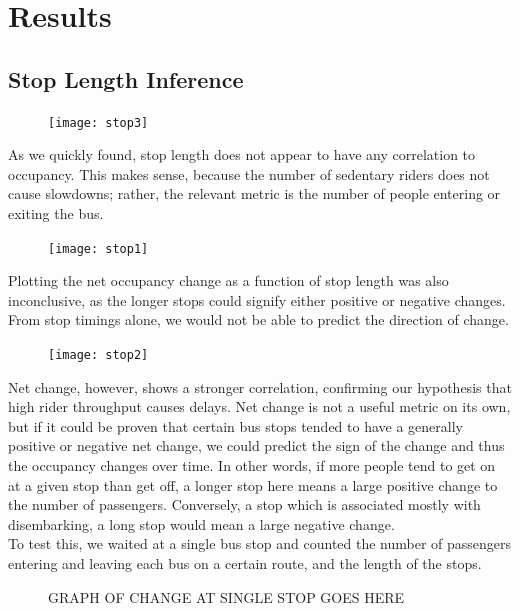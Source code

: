 \documentclass[letterpaper,abstract=on,titlepage=false]{scrreprt}
\begin{document}
\section*{Results}

\subsection*{Stop Length Inference}
	\begin{figure}[H]
	\texttt{[image: stop3]}
	\centering
	\end{figure}
	As we quickly found, stop length does not appear to have any correlation to occupancy.
	This makes sense, because the number of sedentary riders does not cause slowdowns; rather, the relevant metric is the number of people entering or exiting the bus.

	\begin{figure}[H]
	\texttt{[image: stop1]}
	\centering
	\end{figure}

	Plotting the net occupancy change as a function of stop length was also inconclusive, as the longer stops could signify either positive or negative changes.
	From stop timings alone, we would not be able to predict the direction of change.

	\begin{figure}[H]
	\texttt{[image: stop2]}
	\centering
	\end{figure}

	Net change, however, shows a stronger correlation, confirming our hypothesis that high rider throughput causes delays. %
    Net change is not a useful metric on its own, but if it could be proven that certain bus stops tended to have a generally positive or negative net change, we could predict the sign of the change and thus the occupancy changes over time.
	In other words, if more people tend to get on at a given stop than get off, a longer stop here means a large positive change to the number of passengers.
	Conversely, a stop which is associated mostly with disembarking, a long stop would mean a large negative change.
\\
	To test this, we waited at a single bus stop and counted the number of passengers entering and leaving each bus on a certain route, and the length of the stops.

	\begin{figure}[H]
	GRAPH OF CHANGE AT SINGLE STOP GOES HERE
	\centering
	\end{figure}
\end{document}
